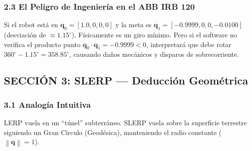 \documentclass[11pt, a4paper]{article}
\begin{document}
\begin{center}
\end{center}

\subsubsection*{2.3 El Peligro de Ingeniería en el ABB IRB 120}
Si el robot está en $\mathbf{q}_0 = [1.0, 0, 0, 0]$ y la meta es $\mathbf{q}_1 = [-0.9999, 0, 0, -0.0100]$ (desviación de $\approx 1.15^\circ$). Físicamente es un giro mínimo. Pero si el software no verifica el producto punto $\mathbf{q}_0 \cdot \mathbf{q}_1 = -0.9999 < 0$, interpretará que debe rotar $360^\circ - 1.15^\circ = 358.85^\circ$, causando daños mecánicos y disparos de sobrecorriente.

\subsection*{SECCIÓN 3: SLERP — Deducción Geométrica}
\subsubsection*{3.1 Analogía Intuitiva}
LERP vuela en un ``túnel'' subterráneo. SLERP vuela sobre la superficie terrestre siguiendo un Gran Círculo (Geodésica), manteniendo el radio constante ($\left\|\mathbf{q}\right\| = 1$).
\end{document}
